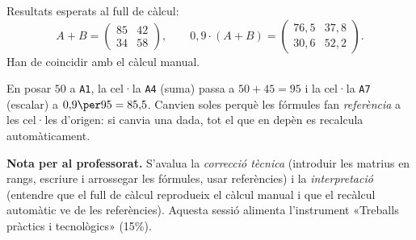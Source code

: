 \begin{solucions}
\begin{sollist}
  \item Resultats esperats al full de càlcul:
        \[ A+B=\begin{pmatrix} 85 & 42 \\ 34 & 58 \end{pmatrix},\qquad
           0{,}9\cdot(A+B)=\begin{pmatrix} 76{,}5 & 37{,}8 \\ 30{,}6 & 52{,}2 \end{pmatrix}. \]
        Han de coincidir amb el càlcul manual.
  \item En posar $50$ a \texttt{A1}, la cel·la \texttt{A4} (suma) passa a
        $50+45=95$ i la cel·la \texttt{A7} (escalar) a $0{,}9\per 95=85{,}5$.
        Canvien soles perquè les fórmules fan \emph{referència} a les cel·les
        d'origen: si canvia una dada, tot el que en depèn es recalcula
        automàticament.
\end{sollist}

\noindent\textbf{Nota per al professorat.} S'avalua la \emph{correcció tècnica}
(introduir les matrius en rangs, escriure i arrossegar les fórmules, usar
referències) i la \emph{interpretació} (entendre que el full de càlcul reprodueix
el càlcul manual i que el recàlcul automàtic ve de les referències). Aquesta
sessió alimenta l'instrument «Treballs pràctics i tecnològics» (15\%).
\end{solucions}
